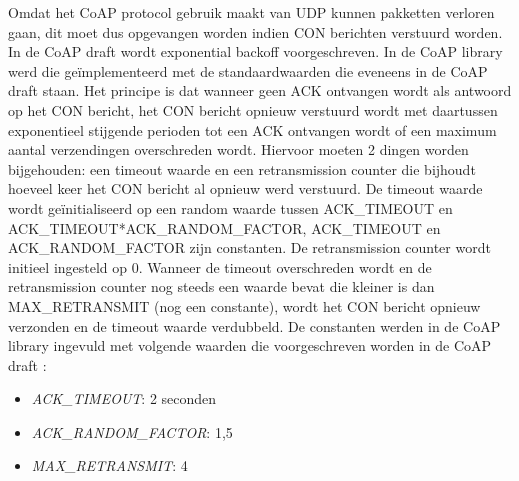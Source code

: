 Omdat het CoAP protocol gebruik maakt van UDP kunnen pakketten verloren gaan, dit moet dus opgevangen worden indien CON berichten verstuurd worden. In de CoAP draft \cite{coapDraft} wordt exponential backoff voorgeschreven. In de CoAP library werd die ge\"{i}mplementeerd met de standaardwaarden die eveneens in de CoAP draft \cite{coapDraft} staan. Het principe is dat wanneer geen ACK ontvangen wordt als antwoord op het CON bericht, het CON bericht opnieuw verstuurd wordt met daartussen exponentieel stijgende perioden tot een ACK ontvangen wordt of een maximum aantal verzendingen overschreden wordt. Hiervoor moeten 2 dingen worden bijgehouden: een timeout waarde en een retransmission counter die bijhoudt hoeveel keer het CON bericht al opnieuw werd verstuurd. De timeout waarde wordt ge\"{i}nitialiseerd op een random waarde tussen ACK\_TIMEOUT en ACK\_TIMEOUT*ACK\_RANDOM\_FACTOR, ACK\_TIMEOUT en ACK\_RANDOM\_FACTOR zijn constanten. De retransmission counter wordt initieel ingesteld op 0. Wanneer de timeout overschreden wordt en de retransmission counter nog steeds een waarde bevat die kleiner is dan MAX\_RETRANSMIT (nog een constante), wordt het CON bericht opnieuw verzonden en de timeout waarde verdubbeld. De constanten werden in de CoAP library ingevuld met volgende waarden die voorgeschreven worden in de CoAP draft  \cite{coapDraft}:
\begin{itemize}
\item \textit{ACK\_TIMEOUT}: 2 seconden
\item \textit{ACK\_RANDOM\_FACTOR}: 1,5
\item \textit{MAX\_RETRANSMIT}: 4
\end{itemize}